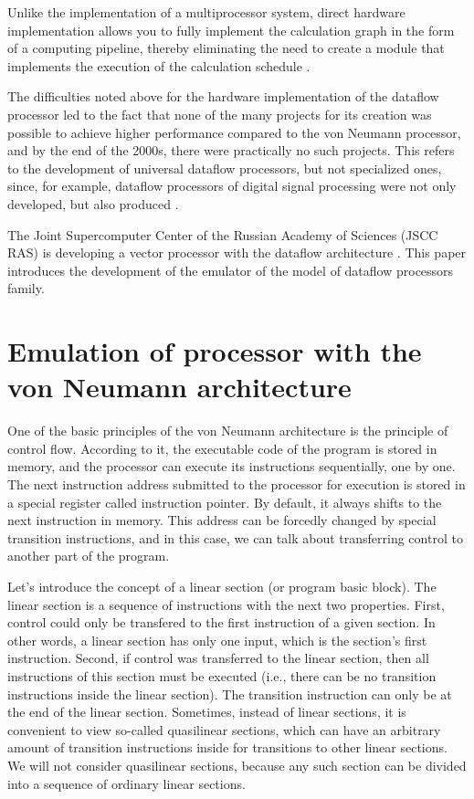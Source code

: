 \documentclass[
11pt,%
tightenlines,%
twoside,%
onecolumn,%
nofloats,%
nobibnotes,%
nofootinbib,%
superscriptaddress,%
noshowpacs,%
centertags]%
{revtex4}
\begin{document}
Unlike the implementation of a multiprocessor system, direct hardware implementation allows you to fully implement the calculation graph in the form of a computing pipeline, thereby eliminating the need to create a module that implements the execution of the calculation schedule \cite{popov}.

The difficulties noted above for the hardware implementation of the dataflow processor led to the fact that none of the many projects for its creation was possible to achieve higher performance compared to the von Neumann processor, and by the end of the 2000s, there were practically no such projects.
This refers to the development of universal dataflow processors, but not specialized ones, since, for example, dataflow processors of digital signal processing were not only developed, but also produced \cite{terada}.

The Joint Supercomputer Center of the Russian Academy of Sciences (JSCC RAS) is developing a vector processor with the dataflow architecture \cite{vpp}.
This paper introduces the development of the emulator of the model of dataflow processors family.


\section{Emulation of processor with the von Neumann architecture}

One of the basic principles of the von Neumann architecture is the principle of control flow.
According to it, the executable code of the program is stored in memory, and the processor can execute its instructions sequentially, one by one.
The next instruction address submitted to the processor for execution is stored in a special register called instruction pointer.
By default, it always shifts to the next instruction in memory.
This address can be forcedly changed by special transition instructions, and in this case, we can talk about transferring control to another part of the program.

Let's introduce the concept of a linear section (or program basic block).
The linear section is a sequence of instructions with the next two properties.
First, control could only be transfered to the first instruction of a given section.
In other words, a linear section has only one input, which is the section's first  instruction.
Second, if control was transferred to the linear section, then all instructions of this section must be executed (i.e., there can be no transition instructions inside the linear section).
The transition instruction can only be at the end of the linear section.
Sometimes, instead of linear sections, it is convenient to view so-called quasilinear sections, which can have an arbitrary amount of transition instructions inside for transitions to other linear sections.
We will not consider quasilinear sections, because any such section can be divided into a sequence of ordinary linear sections.
\end{document}
